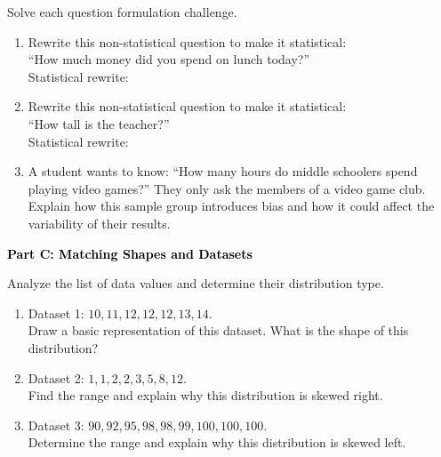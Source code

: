 \documentclass[12pt, letterpaper, fleqn]{article}
\newcommand{\blanklong}{\underline{\hspace{6.5cm}}}
\begin{document}
\vspace{3mm}

\noindent
Solve each question formulation challenge.

\vspace{5mm}

\begin{enumerate}[itemsep=2.5cm, leftmargin=0.6cm]
\item Rewrite this non-statistical question to make it statistical: \\
``How much money did you spend on lunch today?'' \\
Statistical rewrite: \blanklong

\item Rewrite this non-statistical question to make it statistical: \\
``How tall is the teacher?'' \\
Statistical rewrite: \blanklong

\item A student wants to know: ``How many hours do middle schoolers spend playing video games?'' They only ask the members of a video game club. Explain how this sample group introduces bias and how it could affect the variability of their results.
\end{enumerate}

\newpage

\begin{tcolorbox}[colback=black!10]
    \large\textcolor{black}{\textbf{Part C: Matching Shapes and Datasets}}
\end{tcolorbox}

\vspace{3mm}

\noindent
Analyze the list of data values and determine their distribution type.

\vspace{5mm}

\begin{enumerate}[itemsep=2.5cm, leftmargin=0.6cm]
\item Dataset 1: $10, 11, 12, 12, 12, 13, 14$. \\
Draw a basic representation of this dataset. What is the shape of this distribution?
\vspace{1cm}

\item Dataset 2: $1, 1, 2, 2, 3, 5, 8, 12$. \\
Find the range and explain why this distribution is skewed right.
\vspace{1cm}

\item Dataset 3: $90, 92, 95, 98, 98, 99, 100, 100, 100$. \\
Determine the range and explain why this distribution is skewed left.
\end{enumerate}
\end{document}
